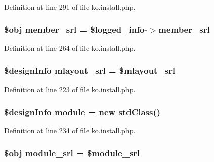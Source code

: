 Definition at line 291 of file ko.\-install.\-php.

\hypertarget{ko_8install_8php_aa61f9e08f0fe505094d26f8143f30bbd}{
\subsubsection[{member\-\_\-srl}]{\setlength{\rightskip}{0pt plus 5cm}\$obj member\-\_\-srl = \$logged\-\_\-info-\/$>$member\-\_\-srl}}\label{ko_8install_8php_aa61f9e08f0fe505094d26f8143f30bbd}


Definition at line 264 of file ko.\-install.\-php.

\hypertarget{ko_8install_8php_a9cf497537007b08c645bed35f564be54}{
\subsubsection[{mlayout\-\_\-srl}]{\setlength{\rightskip}{0pt plus 5cm}\$design\-Info mlayout\-\_\-srl = \$mlayout\-\_\-srl}}\label{ko_8install_8php_a9cf497537007b08c645bed35f564be54}


Definition at line 223 of file ko.\-install.\-php.

\hypertarget{ko_8install_8php_a5c3fc1968f94c2b6a7c60845f284de78}{
\subsubsection[{module}]{\setlength{\rightskip}{0pt plus 5cm}\$design\-Info {\bf module} = new std\-Class()}}\label{ko_8install_8php_a5c3fc1968f94c2b6a7c60845f284de78}


Definition at line 234 of file ko.\-install.\-php.

\hypertarget{ko_8install_8php_a370bb6450fab1da3e0ed9f484a38b761}{
\subsubsection[{module\-\_\-srl}]{\setlength{\rightskip}{0pt plus 5cm}\$obj module\-\_\-srl = \$module\-\_\-srl}}\label{ko_8install_8php_a370bb6450fab1da3e0ed9f484a38b761}


